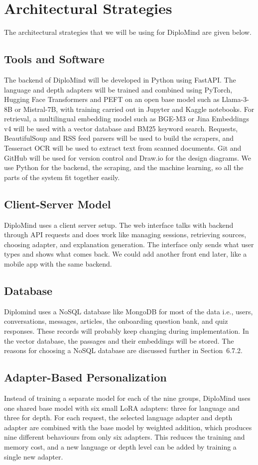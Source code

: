 \documentclass{FastFyp}
\begin{document}
\section{Architectural Strategies}
The architectural strategies that we will be using for DiploMind are given below.
 
\subsection{Tools and Software}
The backend of DiploMind will be developed in Python using FastAPI. The language and depth adapters will be trained and combined using PyTorch, Hugging Face Transformers and PEFT on an open base model such as Llama-3-8B or Mistral-7B, with training carried out in Jupyter and Kaggle notebooks. For retrieval, a multilingual embedding model such as BGE-M3 or Jina Embeddings v4 will be used with a vector database and BM25 keyword search. Requests, BeautifulSoup and RSS feed parsers will be used to build the scrapers, and Tesseract OCR will be used to extract text from scanned documents. Git and GitHub will be used for version control and Draw.io for the design diagrams. We use Python for the backend, the scraping, and the machine learning, so all the parts of the system fit together easily.
 
\subsection{Client-Server Model}
DiploMind uses a client server setup. The web interface talks with backend through API requests and does work like managing sessions, retrieving sources, choosing adapter, and explanation generation. The interface only sends what user types and shows what comes back. We could add another front end later, like a mobile app with the same backend.
 
\subsection{Database}
Diplomind uses a NoSQL database like MongoDB for most of the data i.e., users, conversations, messages, articles, the onboarding question bank, and quiz responses. These records will probably keep changing during implementation. In the vector database, the passages and their embeddings will be stored.  The reasons for choosing a NoSQL database are discussed further in Section~6.7.2.
 
\subsection{Adapter-Based Personalization}
Instead of training a separate model for each of the nine groups, DiploMind uses one shared base model with six small LoRA adapters: three for language and three for depth. For each request, the selected language adapter and depth adapter are combined with the base model by weighted addition, which produces nine different behaviours from only six adapters. This reduces the training and memory cost, and a new language or depth level can be added by training a single new adapter.
 
\end{document}
